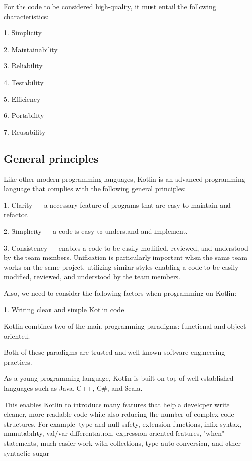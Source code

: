 {{{{{{{{{{{{{{{{For the code to be considered high-quality, it must entail the following characteristics:

1.	Simplicity

2.	Maintainability

3.	Reliability

4.	Testability

5.	Efficiency

6.	Portability

7.	Reusability





\subsection*{\textbf{General principles}}

\label{sec:}



Like other modern programming languages, Kotlin is an advanced programming language that complies with the following general principles:

1.	Clarity — a necessary feature of programs that are easy to maintain and refactor.

2.	Simplicity — a code is easy to understand and implement.

3.	Consistency — enables a code to be easily modified, reviewed, and understood by the team members. Unification is particularly important when the same team works on the same project, utilizing similar styles enabling a code to be easily modified, reviewed, and understood by the team members.



Also, we need to consider the following factors when programming on Kotlin:



1. Writing clean and simple Kotlin code



    Kotlin combines two of the main programming paradigms: functional and object-oriented.

    Both of these paradigms are trusted and well-known software engineering practices.

    As a young programming language, Kotlin is built on top of well-established languages such as Java, C++, C\#, and Scala.

    This enables Kotlin to introduce many features that help a developer write cleaner, more readable code while also reducing the number of complex code structures. For example, type and null safety, extension functions, infix syntax, immutability, val/var differentiation, expression-oriented features, "when" statements, much easier work with collections, type auto conversion, and other syntactic sugar.



}}}}}}}}}}}}}}}}
